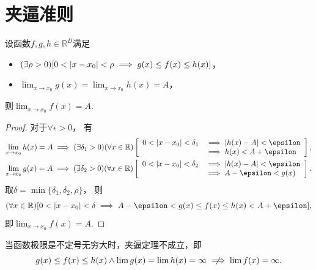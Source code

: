\section{夹逼准则}
\begin{theorem}\label{theorem:函数极限.夹逼准则}
设函数\(f,g,h\in\mathbb{R}^D\)满足\begin{itemize}
	\item \((\exists\rho>0)
	[0<\abs{x-x_0}<\rho \implies g(x) \leq f(x) \leq h(x)]\)，
	\item \(\lim_{x \to x_0} g(x) = \lim_{x \to x_0} h(x) = A\)，
\end{itemize}
则\(\lim_{x \to x_0} f(x) = A\).
\begin{proof}
对于\(\forall\epsilon>0\)，
有\begin{gather*}
	\lim_{x \to x_0} h(x) = A
	\implies
	(\exists\delta_1>0)
	(\forall x\in\mathbb{R})
	\left[
		\begin{array}{rl}
			0<\abs{x-x_0}<\delta_1
			&\implies
			\abs{h(x)-A}<\epsilon \\
			&\implies
			h(x)<A+\epsilon
		\end{array}
	\right], \\
	\lim_{x \to x_0} g(x) = A
	\implies
	(\exists\delta_2>0)
	(\forall x\in\mathbb{R})
	\left[
		\begin{array}{rl}
			0<\abs{x-x_0}<\delta_2
			&\implies
			\abs{h(x)-A}<\epsilon \\
			&\implies
			A-\epsilon<g(x)
		\end{array}
	\right].
\end{gather*}
取\(\delta=\min\{\delta_1,\delta_2,\rho\}\)，
则\begin{equation*}
	(\forall x\in\mathbb{R})
	[
		0<\abs{x-x_0}<\delta
		\implies
		A-\epsilon < g(x) \leq f(x) \leq h(x) < A+\epsilon
	],
\end{equation*}
即\(\lim_{x \to x_0} f(x) = A\).
\end{proof}
\end{theorem}

\begin{remark}
当函数极限是不定号无穷大时，夹逼定理不成立，即\begin{equation*}
	g(x) \leq f(x) \leq h(x)
	\land
	\lim g(x) = \lim h(x) = \infty
	\notimplies
	\lim f(x) = \infty.
\end{equation*}
\end{remark}

